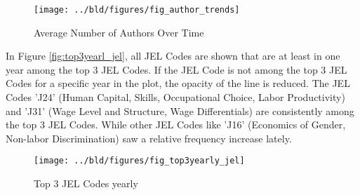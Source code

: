 \documentclass[11pt, a4paper, leqno]{article}
\begin{document}
\begin{figure}
    \centering
    \texttt{[image: ../bld/figures/fig\_author\_trends]}
    \caption{Average Number of Authors Over Time}
    \label{fig:author_trends}
\end{figure}

In Figure \ref{fig:top3yearl_jel}, all JEL Codes are shown that are at least in one year among the top 3 JEL Codes.
If the JEL Code is not among the top 3 JEL Codes for a specific year in the plot, the opacity of the line is reduced.
The JEL Codes 'J24' (Human Capital, Skills, Occupational Choice, Labor Productivity) and 'J31' (Wage Level and Structure, Wage Differentials) are consistently among the top 3 JEL Codes.
While other JEL Codes like 'J16' (Economics of Gender, Non-labor Discrimination) saw a relative frequency increase lately.

\begin{figure}
    \centering
    \texttt{[image: ../bld/figures/fig\_top3yearly\_jel]}
    \caption{Top 3 JEL Codes yearly}
    \label{fig:top3yearly_jel}
\end{figure}
\end{document}
